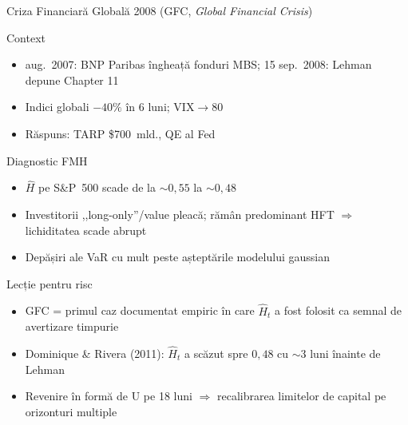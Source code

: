 \documentclass[9pt, aspectratio=169, t]{beamer}
\begin{document}
\begin{frame}[shrink=15]{Criza Financiară Globală 2008 (GFC, \textit{Global Financial Crisis})}
\begin{cminipage}{0.95\textwidth}
\begin{block}{Context}
\begin{itemize}\setlength{\itemsep}{0pt}
    \item aug.\ 2007: BNP Paribas îngheață fonduri MBS; 15 sep.\ 2008: Lehman depune Chapter 11
    \item Indici globali $-40\%$ în 6 luni; VIX$\to 80$
    \item Răspuns: TARP \$700~mld., QE al Fed
\end{itemize}
\end{block}
\begin{alertblock}{Diagnostic FMH}
\begin{itemize}\setlength{\itemsep}{0pt}
    \item $\hat H$ pe S\&P~500 scade de la $\sim 0{,}55$ la $\sim 0{,}48$
    \item Investitorii ,,long-only''/value pleacă; rămân predominant HFT $\Rightarrow$ lichiditatea scade abrupt
    \item Depășiri ale VaR cu mult peste așteptările modelului gaussian
\end{itemize}
\end{alertblock}
\begin{exampleblock}{Lecție pentru risc}
\begin{itemize}\setlength{\itemsep}{0pt}
    \item GFC = primul caz documentat empiric în care $\hat H_t$ a fost folosit ca semnal de avertizare timpurie
    \item Dominique \& Rivera (2011): $\hat H_t$ a scăzut spre $0{,}48$ cu $\sim$3 luni înainte de Lehman
    \item Revenire în formă de U pe 18 luni $\Rightarrow$ recalibrarea limitelor de capital pe orizonturi multiple
\end{itemize}
\end{exampleblock}
\end{cminipage}
\end{frame}
\end{document}

